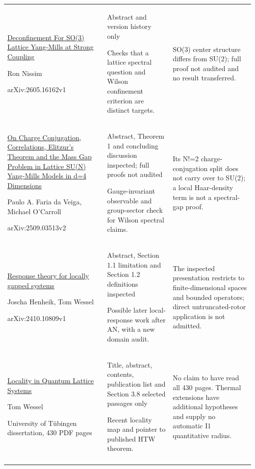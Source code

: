 \begin{longtable}{@{}p{46mm}p{60mm}p{46mm}@{}}
\href{https://arxiv.org/abs/2605.16162}{Deconfinement For SO(3) Lattice Yang-Mills at Strong Coupling}\par Ron Nissim\par arXiv:2605.16162v1 & Abstract and version history only\par Checks that a lattice spectral question and Wilson confinement criterion are distinct targets. & SO(3) center structure differs from SU(2); full proof not audited and no result transferred.\\\addlinespace
\href{https://arxiv.org/html/2509.03513v2}{On Charge Conjugation, Correlations, Elitzur's Theorem and the Mass Gap Problem in Lattice SU(N) Yang-Mills Models in d=4 Dimensions}\par Paulo A. Faria da Veiga, Michael O’Carroll\par arXiv:2509.03513v2 & Abstract, Theorem 1 and concluding discussion inspected; full proofs not audited\par Gauge-invariant observable and group-sector check for Wilson spectral claims. & Its N!=2 charge-conjugation split does not carry over to SU(2); a local Haar-density term is not a spectral-gap proof.\\\addlinespace
\href{https://arxiv.org/html/2410.10809v1}{Response theory for locally gapped systems}\par Joscha Henheik, Tom Wessel\par arXiv:2410.10809v1 & Abstract, Section 1.1 limitation and Section 1.2 definitions inspected\par Possible later local-response work after AN, with a new domain audit. & The inspected presentation restricts to finite-dimensional spaces and bounded operators; direct untruncated-rotor application is not admitted.\\\addlinespace
\href{https://publikationen.uni-tuebingen.de/xmlui/bitstream/handle/10900/179005/Dissertation-Tom-Wessel.pdf?isAllowed=y&sequence=1}{Locality in Quantum Lattice Systems}\par Tom Wessel\par University of Tübingen dissertation, 430 PDF pages & Title, abstract, contents, publication list and Section 3.8 selected passages only\par Recent locality map and pointer to published HTW theorem. & No claim to have read all 430 pages. Thermal extensions have additional hypotheses and supply no automatic I1 quantitative radius.\\\addlinespace

\end{longtable}
